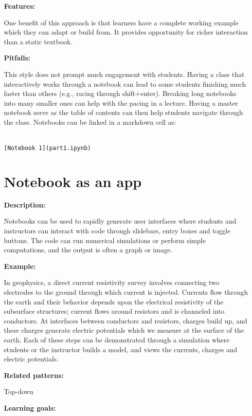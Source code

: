 \documentclass[]{book}
\begin{document}
\textbf{Features:}

One benefit of this approach is that learners have a complete working
example which they can adapt or build from. It provides opportunity for
richer interaction than a static textbook.

\textbf{Pitfalls:}

This style does not prompt much engagement with students. Having a class
that interactively works through a notebook can lead to some students
finishing much faster than others (e.g., racing through shift+enter).
Breaking long notebooks into many smaller ones can help with the pacing
in a lecture. Having a master notebook serve as the table of contents
can then help students navigate through the class. Notebooks can be
linked in a markdown cell as:

\begin{verbatim}

[Notebook 1](part1.ipynb)
\end{verbatim}

\section{Notebook as an app}\label{notebook-as-an-app}

\textbf{Description:}

Notebooks can be used to rapidly generate user interfaces where students
and instructors can interact with code through slidebars, entry boxes
and toggle buttons. The code can run numerical simulations or perform
simple computations, and the output is often a graph or image.

\textbf{Example:}

In geophysics, a direct current resistivity survey involves connecting
two electrodes to the ground through which current is injected. Currents
flow through the earth and their behavior depends upon the electrical
resistivity of the subsurface structures; current flows around resistors
and is channeled into conductors. At interfaces between conductors and
resistors, charges build up, and these charges generate electric
potentials which we measure at the surface of the earth. Each of these
steps can be demonstrated through a simulation where students or the
instructor builds a model, and views the currents, charges and electric
potentials.

\textbf{Related patterns:}

Top-down

\textbf{Learning goals:}
\end{document}
